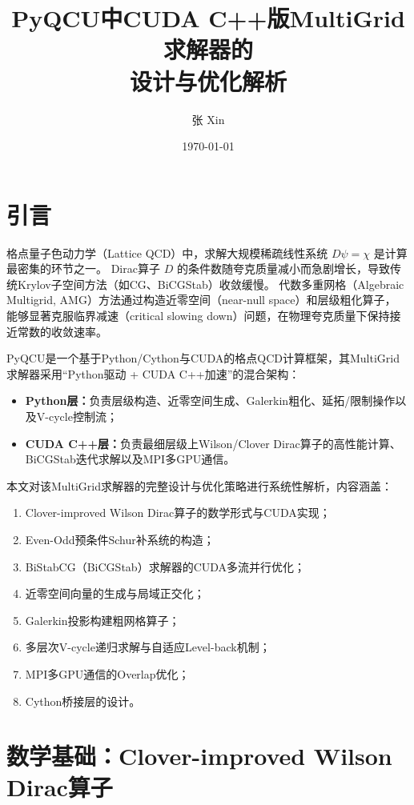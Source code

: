 \documentclass[11pt,a4paper]{article}
\title{\textbf{PyQCU中CUDA C++版MultiGrid求解器的\\设计与优化解析}}
\author{张 Xin}
\date{\today}
\begin{document}
\maketitle
\tableofcontents
\newpage

\section{引言}

格点量子色动力学（Lattice QCD）中，求解大规模稀疏线性系统 $D\psi = \chi$ 是计算最密集的环节之一。
Dirac算子 $D$ 的条件数随夸克质量减小而急剧增长，导致传统Krylov子空间方法（如CG、BiCGStab）收敛缓慢。
代数多重网格（Algebraic Multigrid, AMG）方法通过构造近零空间（near-null space）和层级粗化算子，
能够显著克服临界减速（critical slowing down）问题，在物理夸克质量下保持接近常数的收敛速率。

PyQCU是一个基于Python/Cython与CUDA的格点QCD计算框架，其MultiGrid求解器采用``Python驱动 + CUDA C++加速''的混合架构：
\begin{itemize}
    \item \textbf{Python层：}负责层级构造、近零空间生成、Galerkin粗化、延拓/限制操作以及V-cycle控制流；
    \item \textbf{CUDA C++层：}负责最细层级上Wilson/Clover Dirac算子的高性能计算、BiCGStab迭代求解以及MPI多GPU通信。
\end{itemize}

本文对该MultiGrid求解器的完整设计与优化策略进行系统性解析，内容涵盖：
\begin{enumerate}
    \item Clover-improved Wilson Dirac算子的数学形式与CUDA实现；
    \item Even-Odd预条件Schur补系统的构造；
    \item BiStabCG（BiCGStab）求解器的CUDA多流并行优化；
    \item 近零空间向量的生成与局域正交化；
    \item Galerkin投影构建粗网格算子；
    \item 多层次V-cycle递归求解与自适应Level-back机制；
    \item MPI多GPU通信的Overlap优化；
    \item Cython桥接层的设计。
\end{enumerate}

\section{数学基础：Clover-improved Wilson Dirac算子}
\end{document}
